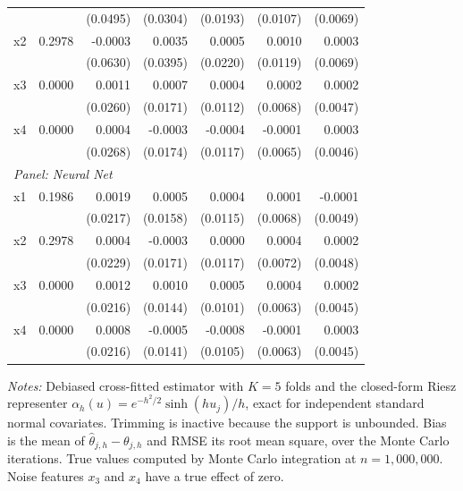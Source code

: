 \begin{table}[htbp]
\begin{threeparttable}
\begin{tabular}{lrrrrrr}
 &  & (0.0495) & (0.0304) & (0.0193) & (0.0107) & (0.0069) \\
\quad x2 & 0.2978 & -0.0003 & 0.0035 & 0.0005 & 0.0010 & 0.0003 \\
 &  & (0.0630) & (0.0395) & (0.0220) & (0.0119) & (0.0069) \\
\quad x3 & 0.0000 & 0.0011 & 0.0007 & 0.0004 & 0.0002 & 0.0002 \\
 &  & (0.0260) & (0.0171) & (0.0112) & (0.0068) & (0.0047) \\
\quad x4 & 0.0000 & 0.0004 & -0.0003 & -0.0004 & -0.0001 & 0.0003 \\
 &  & (0.0268) & (0.0174) & (0.0117) & (0.0065) & (0.0046) \\
\midrule
\multicolumn{7}{l}{\textit{Panel: Neural Net}} \\
\quad x1 & 0.1986 & 0.0019 & 0.0005 & 0.0004 & 0.0001 & -0.0001 \\
 &  & (0.0217) & (0.0158) & (0.0115) & (0.0068) & (0.0049) \\
\quad x2 & 0.2978 & 0.0004 & -0.0003 & 0.0000 & 0.0004 & 0.0002 \\
 &  & (0.0229) & (0.0171) & (0.0117) & (0.0072) & (0.0048) \\
\quad x3 & 0.0000 & 0.0012 & 0.0010 & 0.0005 & 0.0004 & 0.0002 \\
 &  & (0.0216) & (0.0144) & (0.0101) & (0.0063) & (0.0045) \\
\quad x4 & 0.0000 & 0.0008 & -0.0005 & -0.0008 & -0.0001 & 0.0003 \\
 &  & (0.0216) & (0.0141) & (0.0105) & (0.0063) & (0.0045) \\
\bottomrule
\end{tabular}
\begin{tablenotes}
\footnotesize
\item \textit{Notes:} Debiased cross-fitted estimator with $K=5$ folds and the closed-form Riesz representer $\alpha_h(u) = e^{-h^2/2}\sinh(h u_j)/h$, exact for independent standard normal covariates. Trimming is inactive because the support is unbounded. Bias is the mean of $\hat{\theta}_{j,h} - \theta_{j,h}$ and RMSE its root mean square, over the Monte Carlo iterations. True values computed by Monte Carlo integration at $n=1{,}000{,}000$. Noise features $x_3$ and $x_4$ have a true effect of zero.
\end{tablenotes}
\end{threeparttable}
\end{table}